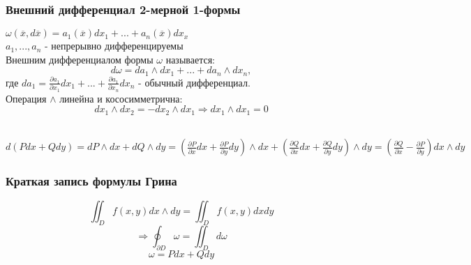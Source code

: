 \subsubsection{Внешний дифференциал 2-мерной 1-формы}
    \begin{definition*}    
        $\omega\left(\overline{x}, d\overline{x}\right) = a_1\left(\overline{x}\right)dx_1 + ... + a_n\left(\overline{x}\right)dx_x$\\
        $a_1, ..., a_n$ - непрерывно дифференцируемы\\
        Внешним дифференциалом формы $\omega$ называется:\\
        $$d\omega = da_1 \wedge dx_1 + ... + da_n \wedge dx_n,$$
        где $da_1 = \frac{\partial a_1}{\partial x_1} dx_1 + ... + \frac{\partial a_1}{\partial x_n}dx_n$ - обычный дифференциал.\\
        Операция $\wedge$ линейна и кососимметрична:\\
        $$dx_1 \wedge dx_2 = - dx_2 \wedge dx_1 \Rightarrow dx_1 \wedge dx_1 = 0$$\\
    \end{definition*}
    
\begin{example}    
    $d\left(Pdx + Qdy\right) = dP \wedge dx + dQ \wedge dy = \left(\frac{\partial P}{\partial x}dx + \frac{\partial P}{\partial y}dy\right) \wedge dx + \left(\frac{\partial Q}{\partial x}dx + \frac{\partial Q}{\partial y}dy\right) \wedge dy = \left(\frac{\partial Q}{\partial x} - \frac{\partial P}{\partial y}\right)dx \wedge dy$\\
\end{example}
    
\subsubsection{Краткая запись формулы Грина}
    $$\iint_D f\left(x, y\right)dx \wedge dy = \iint_D f\left(x, y\right) dxdy$$
    $$\Rightarrow \oint_{\partial D} \omega = \iint_D d\omega$$
    $$\omega = Pdx + Qdy$$